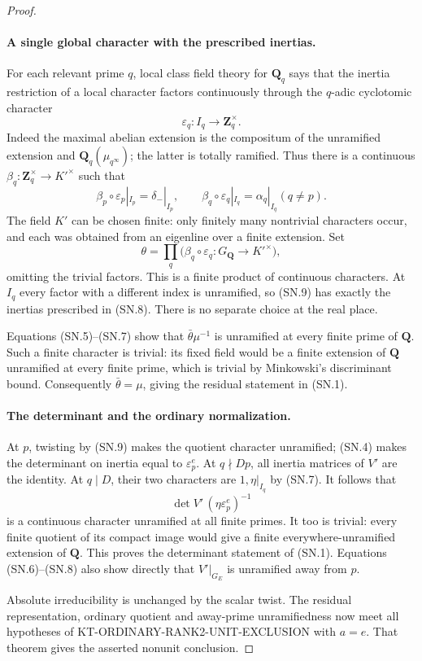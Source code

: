 \begin{proof}
\paragraph{A single global character with the prescribed inertias.}
For each relevant prime $q$, local class field theory for
$\mathbf Q_q$ says that the inertia restriction of a local
character factors continuously through the $q$-adic cyclotomic
character
\[
                 \varepsilon_q:I_q\longrightarrow
                                      \mathbf Z_q^{\times}.
\]
Indeed the maximal abelian extension is the compositum of the
unramified extension and $\mathbf Q_q(\mu_{q^{\infty}})$;
the latter is totally ramified.  Thus there is a continuous
$\beta_q:\mathbf Z_q^{\times}\to K'^{\times}$ such that
\[
 \beta_p\circ\varepsilon_p|_{I_p}=\delta_-|_{I_p},
 \qquad
 \beta_q\circ\varepsilon_q|_{I_q}=\alpha_q|_{I_q} (q\ne p).
                                                               \tag{SN.8}
\]
The field $K'$ can be chosen finite: only finitely many nontrivial
characters occur, and each was obtained from an eigenline over
a finite extension.  Set
\[
               \theta=\prod_q\bigl(\beta_q\circ
                         \varepsilon_q:G_{\mathbf Q}\to K'^{\times}\bigr),
                                                               \tag{SN.9}
\]
omitting the trivial factors.  This is a finite product of
continuous characters.  At $I_q$ every factor with a different
index is unramified, so (SN.9) has exactly the inertias prescribed
in (SN.8).  There is no separate choice at the real place.

Equations (SN.5)--(SN.7) show that $\bar\theta\mu^{-1}$ is
unramified at every finite prime of $\mathbf Q$.
Such a finite character is trivial: its fixed field would be
a finite extension of $\mathbf Q$ unramified at every finite
prime, which is trivial by Minkowski's discriminant bound.
Consequently $\bar\theta=\mu$, giving the residual statement
in (SN.1).

\paragraph{The determinant and the ordinary normalization.}
At $p$, twisting by (SN.9) makes the quotient character
unramified; (SN.4) makes the determinant on inertia equal to
$\varepsilon_p^e$.  At $q\nmid Dp$, all inertia matrices of
$V'$ are the identity.  At $q\mid D$, their two characters are
$1,\eta|_{I_q}$ by (SN.7).  It follows that
\[
                    \det V'\,(\eta\varepsilon_p^e)^{-1}
                                                               \tag{SN.10}
\]
is a continuous character unramified at all finite primes.
It too is trivial: every finite quotient of its compact image
would give a finite everywhere-unramified extension of
$\mathbf Q$.  This proves the determinant statement of (SN.1).
Equations (SN.6)--(SN.8) also show directly that
$V'|_{G_E}$ is unramified away from $p$.

Absolute irreducibility is unchanged by the scalar twist.
The residual representation, ordinary quotient and away-prime
unramifiedness now meet all hypotheses of
KT-ORDINARY-RANK2-UNIT-EXCLUSION with $a=e$.
That theorem gives the asserted nonunit conclusion.
\end{proof}

